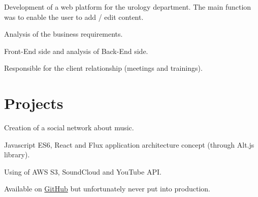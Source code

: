 \documentclass[letterpaper]{my-resume} %
\begin{document}
\begin{minipage}[t]{0.66\textwidth}
\sectionspace %



Development of a web platform for the urology department. The main function was to enable the user to add / edit content.
\begin{tightitemize}
\item Analysis of the business requirements.
\item Front-End side and analysis of Back-End side.
\item Responsible for the client relationship (meetings and trainings).
\end{tightitemize}

\sectionspace %


\section{Projects}

Creation of a social network about music.
\begin{tightitemize}
\item Javascript ES6, React and Flux application architecture concept (through Alt.js library).
\item Using of AWS S3, SoundCloud and YouTube API.
\item Available on \href{https://github.com/bokzor/musicShare}{GitHub} but unfortunately never put into production.
\end{tightitemize}


\end{minipage}
\end{document}
